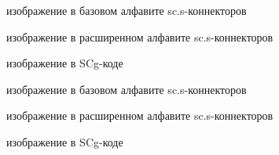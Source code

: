 \begin{scnstruct}
    \begin{scnrelfromlist}{изображение в базовом алфавите sc.s-коннекторов}
        \scnitem{\scnfileclass{\textunderscore\textunderscore-/>}}
        \scnitem{\scnfileclass{</-\textunderscore\textunderscore}}
    \end{scnrelfromlist}
    \begin{scnrelfromlist}{изображение в расширенном алфавите sc.s-коннекторов}
        \scnitem{\scnfileclass{\textunderscore\textunderscore$/\ni$}}
        \scnitem{\scnfileclass{$\in$/\textunderscore\textunderscore}}
    \end{scnrelfromlist}
    \begin{scnrelfromlist}{изображение в SCg-коде}
    \end{scnrelfromlist}

    \begin{scnrelfromlist}{изображение в базовом алфавите sc.s-коннекторов}
        \scnitem{\scnfileclass{\textunderscore\textunderscore$\sim$>}}
        \scnitem{\scnfileclass{<$\sim$\textunderscore\textunderscore}} 
    \end{scnrelfromlist}
    \begin{scnrelfromlist}{изображение в расширенном алфавите sc.s-коннекторов}
        \scnitem{\scnfileclass{\textunderscore\textunderscore$\sim\ni$}}
        \scnitem{\scnfileclass{$\in\sim$\textunderscore\textunderscore}}
    \end{scnrelfromlist}
    \begin{scnrelfromlist}{изображение в SCg-коде}
    \end{scnrelfromlist}


\end{scnstruct}

